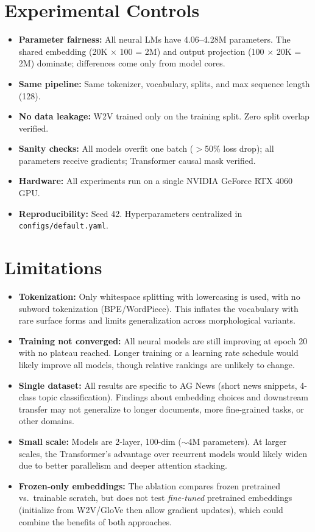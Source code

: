 \documentclass[11pt]{article}
\begin{document}
\section{Experimental Controls}

\begin{itemize}[nosep]
\item \textbf{Parameter fairness:} All neural LMs have 4.06--4.28M parameters. The shared embedding (20K $\times$ 100 = 2M) and output projection (100 $\times$ 20K = 2M) dominate; differences come only from model cores.
\item \textbf{Same pipeline:} Same tokenizer, vocabulary, splits, and max sequence length (128).
\item \textbf{No data leakage:} W2V trained only on the training split. Zero split overlap verified.
\item \textbf{Sanity checks:} All models overfit one batch ($>$50\% loss drop); all parameters receive gradients; Transformer causal mask verified.
\item \textbf{Hardware:} All experiments run on a single NVIDIA GeForce RTX 4060 GPU.
\item \textbf{Reproducibility:} Seed 42. Hyperparameters centralized in \texttt{configs/default.yaml}.
\end{itemize}

\section{Limitations}

\begin{itemize}[nosep]
\item \textbf{Tokenization:} Only whitespace splitting with lowercasing is used, with no subword tokenization (BPE/WordPiece). This inflates the vocabulary with rare surface forms and limits generalization across morphological variants.
\item \textbf{Training not converged:} All neural models are still improving at epoch 20 with no plateau reached. Longer training or a learning rate schedule would likely improve all models, though relative rankings are unlikely to change.
\item \textbf{Single dataset:} All results are specific to AG News (short news snippets, 4-class topic classification). Findings about embedding choices and downstream transfer may not generalize to longer documents, more fine-grained tasks, or other domains.
\item \textbf{Small scale:} Models are 2-layer, 100-dim ($\sim$4M parameters). At larger scales, the Transformer's advantage over recurrent models would likely widen due to better parallelism and deeper attention stacking.
\item \textbf{Frozen-only embeddings:} The ablation compares frozen pretrained vs.\ trainable scratch, but does not test \emph{fine-tuned} pretrained embeddings (initialize from W2V/GloVe then allow gradient updates), which could combine the benefits of both approaches.
\end{itemize}
\end{document}
